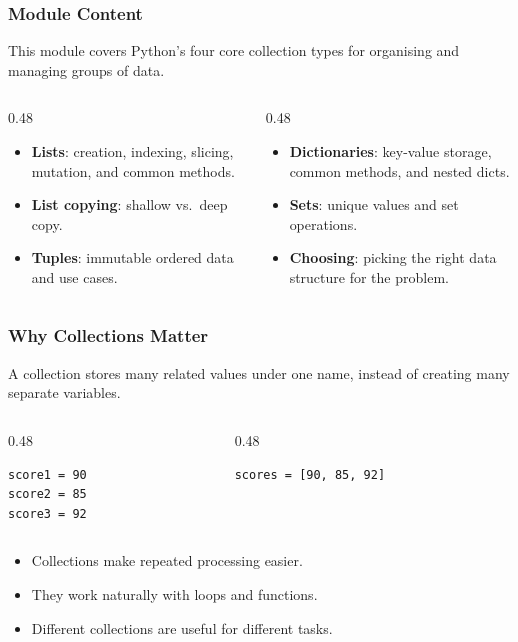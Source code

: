 \documentclass[aspectratio=169,10pt]{beamer}
\newcommand{\keyword}[1]{\textcolor{PrimaryBlue}{\textbf{#1}}}
\newenvironment{bluebox}[1]{%
  \vspace{0.08cm}\begin{tcolorbox}[lecturebox,title={#1},fontupper=\small]%
}{\end{tcolorbox}\vspace{0.05cm}}
\begin{document}
\begin{frame}
\frametitle{Module Content}
\small
This module covers Python's four core collection types for organising and managing groups of data.

\vspace{0.16cm}
\begin{columns}[T,totalwidth=0.96\textwidth]
\begin{column}{0.48\textwidth}
\begin{itemize}\setlength\itemsep{0.08cm}
  \item \keyword{Lists}: creation, indexing, slicing, mutation, and common methods.
  \item \keyword{List copying}: shallow vs.\ deep copy.
  \item \keyword{Tuples}: immutable ordered data and use cases.
\end{itemize}
\end{column}
\begin{column}{0.48\textwidth}
\begin{itemize}\setlength\itemsep{0.08cm}
  \item \keyword{Dictionaries}: key-value storage, common methods, and nested dicts.
  \item \keyword{Sets}: unique values and set operations.
  \item \keyword{Choosing}: picking the right data structure for the problem.
\end{itemize}
\end{column}
\end{columns}
\end{frame}


\begin{frame}[fragile]
\frametitle{Why Collections Matter}
\begin{bluebox}{Key idea}
A collection stores many related values under one name, instead of creating many separate variables.
\end{bluebox}
\vspace{0.15cm}
\begin{columns}[T]
\begin{column}{0.48\textwidth}
\begin{lstlisting}[style=py]
score1 = 90
score2 = 85
score3 = 92
\end{lstlisting}
\end{column}
\begin{column}{0.48\textwidth}
\begin{lstlisting}[style=py]
scores = [90, 85, 92]
\end{lstlisting}
\end{column}
\end{columns}
\begin{itemize}
  \item Collections make repeated processing easier.
  \item They work naturally with loops and functions.
  \item Different collections are useful for different tasks.
\end{itemize}
\end{frame}
\end{document}

